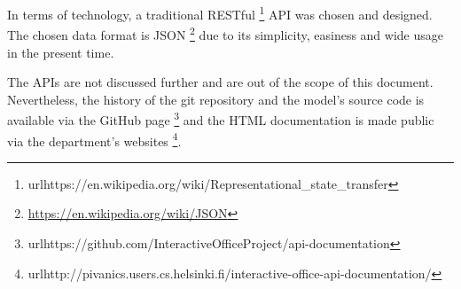 In terms of technology, a traditional RESTful \footnote{url{https://en.wikipedia.org/wiki/Representational\_state\_transfer}} API was chosen and designed. The chosen data format is JSON \footnote{\url{https://en.wikipedia.org/wiki/JSON}} due to its simplicity, easiness and wide usage in the present time. 

The APIs are not discussed further and are out of the scope of this document. Nevertheless, the history of the git repository and the model's source code is available via the GitHub page \footnote{url{https://github.com/InteractiveOfficeProject/api-documentation}} and the HTML documentation is made public via the department's websites \footnote{url{http://pivanics.users.cs.helsinki.fi/interactive-office-api-documentation/}}. 